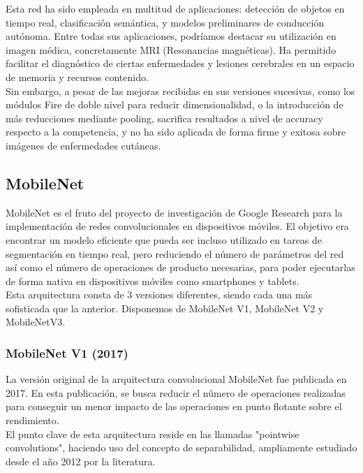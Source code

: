 Esta red ha sido empleada en multitud de aplicaciones: detección de objetos en tiempo real, clasificación semántica, y modelos preliminares de conducción autónoma. Entre todas sus aplicaciones, podríamos destacar su utilización en imagen médica, concretamente MRI (Resonancias magnéticas). Ha permitido facilitar el diagnóstico de ciertas enfermedades y lesiones cerebrales en un espacio de memoria y recursos contenido.\\

Sin embargo, a pesar de las mejoras recibidas en sus versiones sucesivas, como los módulos Fire de doble nivel para reducir dimensionalidad, o la introducción de más reducciones mediante pooling, sacrifica resultados a nivel de accuracy respecto a la competencia, y no ha sido aplicada de forma firme y exitosa sobre imágenes de enfermedades cutáneas.



\subsection{MobileNet}

MobileNet es el fruto del proyecto de investigación de Google Research para la implementación de redes convolucionales en dispositivos móviles. El objetivo era encontrar un modelo eficiente que pueda ser incluso utilizado en tareas de segmentación en tiempo real, pero reduciendo el número de parámetros del red así como el número de operaciones de producto necesarias, para poder ejecutarlas de forma nativa en dispositivos móviles como smartphones y tablets.\\

Esta arquitectura consta de 3 versiones diferentes, siendo cada una más sofisticada que la anterior. Disponemos de MobileNet V1, MobileNet V2 y MobileNetV3.

\subsubsection{MobileNet V1 (2017)}

La versión original de la arquitectura convolucional MobileNet  \cite{howard2017mobilenets} fue publicada en 2017. En esta publicación, se busca reducir el número de operaciones realizadas para conseguir un menor impacto de las operaciones en punto flotante sobre el rendimiento.\\
El punto clave de esta arquitectura reside en las llamadas "pointwise convolutions", haciendo uso del concepto de separabilidad, ampliamente estudiado desde el año 2012 por la literatura.

